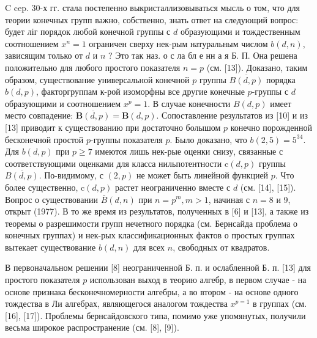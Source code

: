 \documentclass[10pt]{article}
\begin{document}
C cep. 30-х гг. стала постепенно выкристаллизовываться мысль о том, что для теории конечных групп важно, собственно, знать ответ на следующий вопрос: будет ліг порядок любой конечной группы с $d$ образующими и тождественным соотношением $x^{n}=1$ ограничен сверху нек-рым натуральным числом $b(d, n)$, зависящим только от $d$ и $n$ ? Это так наз. о с ла бл е нн а я Б. П. Она решена положительно для любого простого показателя $n=p$ (см. [13]). Доказано, таким образом, существование универсальной конечной $p$ группы $\overline{B(d, p)}$ порядка $b(d, p)$, факторгруппам к-рой изоморфны все другие конечные $p$-группы с $d$ образующими и соотношением $x^{p}=1$. В случае конечности $B(d, p)$ имеет место совпадение: $\overline{\boldsymbol{B}(d, p)}=\boldsymbol{B}(d, p)$. Сопоставление результатов из [10] и из [13] приводит к существованию при достаточно болышом $p$ конечно порожденной бесконечной простой $p$-группы показателя $p$. Было доказано, что $b(2,5)=5^{34}$. Для $b(d, p)$ при $p \geqslant 7$ имеютоя лишь нек-рые оценки снизу, связанные с соответствующими оценками для класса нильпотентности $\mathrm{c}(d, p)$ группы $\overline{B(d, p)}$. По-видимому, с $(2, p)$ не может быть линейной функцией $p$. Что более существенно, $\mathrm{c}(d, p)$ растет неограниченно вместе с $d$ (см. [14], [15]). Вопрос о существовании $\bar{B}(d, n)$ при $n=p^{m}, m>1$, начиная с $n=8$ и 9, открыт (1977). В то же время из результатов, полученных в [6] и [13], а также из теоремы о разрешимости групп нечетного порядка (см. Бернсайда проблема о конечных группах) и нек-рых классификационных фактов о простых группах вытекает существование $b(d, n)$ для всех $n$, свободных от квадратов.



В первоначальном решении [8] неограниченной Б. п. и ослабленной Б. п. [13] для простого показателя $p$ использован выход в теорию алгебр, в первом случае - на основе признака бесконечномерности алгебры, а во втором - на основе одного тождества в Ли алгебрах, являющегося аналогом тождества $x^{p=1}$ в группах (см. [16], [17]). Проблемы бернсайдовского типа, помимо уже упомянутых, получили весьма широкое распространение (см. [8], [9]).
\end{document}
